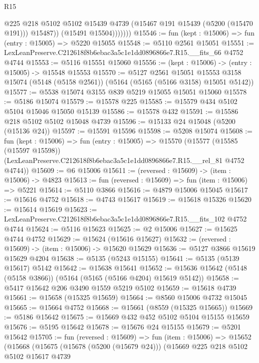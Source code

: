 \begin{lexlean}{R15}
\begin{coremodule}
{{{{{{{{{{{                    @225
                    @218
                    @5102
                    @5102
                    @15439
                    @4739
                    (@15467 @191 @15439 (@5200 (@15470 @191)))
                    @15487))
                (@15491 @15504)))))))
@15546 := fun (kept : @15006) => fun (entry : @15005) => @5220 @15055
@15548 := @5110 @2561 @15051
@15551 := LexLeanPreserve.C212618f8b6ebac3a5c1e1dd0896866e7.R15.__fits_66 @4752 @4744
@15553 := @5116 @15551 @15060
@15556 := (kept : @15006) -> (entry : @15005) -> @15548 @15553
@15570 := @5127
    @2561
    @15051
    @15553
    @3158
    @15074
    (@5148 (@5158 @2561))
    (@5164 (@5165 (@5166 @3158) @15051 @5142))
@15577 := @5538 @15074 @3155 @839 @5219 @15055 @15051 @15060
@15578 := @5186 @15074
@15579 := @15578 @225
@15585 := @15579 @434 @5102 @5104 @15046 @15050 @15139
@15586 := @15578 @432
@15591 := @15586 @218 @5102 @5102 @15048 @4739
@15596 := @15133 @24 @15048 (@5200 (@15136 @24))
@15597 := @15591 @15596
@15598 := @5208 @15074
@15608 := fun (kept : @15006) =>
  fun (entry : @15005) =>
  @15570
    (@15577
      (@15585 (@15597 @15598))
      (LexLeanPreserve.C212618f8b6ebac3a5c1e1dd0896866e7.R15.__rel_81 @4752 @4744))
@15609 := @6 @15006
@15611 := (reversed : @15609) -> (item : @15006) -> @4823
@15613 := fun (reversed : @15609) => fun (item : @15006) => @5221
@15614 := @5110 @3866
@15616 := @4879 @15006 @15045
@15617 := @15616 @4752
@15618 := @4743 @15617
@15619 := @15618 @15326
@15620 := @15614 @15619
@15623 := LexLeanPreserve.C212618f8b6ebac3a5c1e1dd0896866e7.R15.__fits_102 @4752 @4744
@15624 := @5116 @15623
@15625 := @2 @15006
@15627 := @15625 @4744 @4752
@15629 := @15624 (@15616 @15627)
@15632 := (reversed : @15609) -> (item : @15006) -> @15620 @15629
@15636 := @5127 @3866 @15619 @15629 @4204
@15638 := @5135 (@5243 @15155)
@15641 := @5135 (@5139 @15617) @5142
@15642 := @15638 @15641
@15652 := @15636 @15642 (@5148 (@5158 @3866)) (@5164 (@5165 (@5166 @4204) @15619 @5142))
@15658 := @5417 @15642 @206 @3490 @1559 @5219 @5102
@15659 := @15618 @4739
@15661 := @15658 (@15325 @15659)
@15664 := @8560 @15006 @4732 @15045
@15665 := @15664 @4752
@15668 := @15661 (@8559 (@15325 @15665))
@15669 := @5186 @15642
@15675 := @15669 @432 @452 @5102 @5104 @15155 @15659
@15676 := @5195 @15642
@15678 := @15676 @24 @15155
@15679 := @5201 @15642
@15705 := fun (reversed : @15609) =>
  fun (item : @15006) =>
  @15652
    (@15668
      (@15675
        (@15678 (@5200 (@15679 @24)))
        (@15669
          @225
          @218
          @5102
          @5102
          @15617
          @4739
}}}}}}}}}}}
\end{coremodule}
\end{lexlean}
